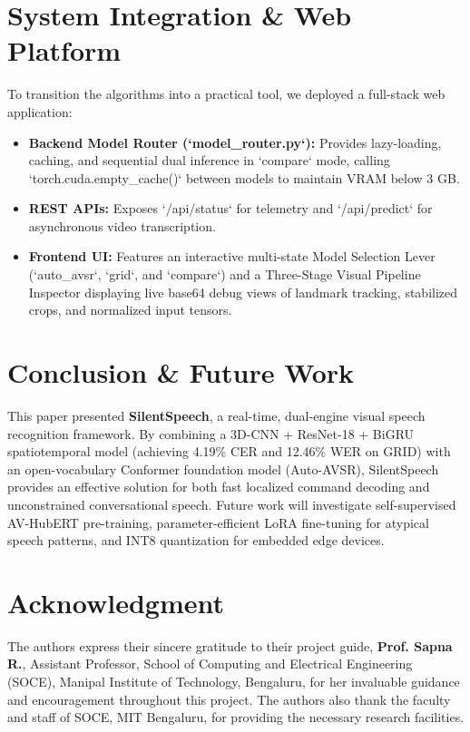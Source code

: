 \documentclass[conference,compsoc,10pt]{IEEEtran}
\begin{document}
\section{System Integration \& Web Platform}

To transition the algorithms into a practical tool, we deployed a full-stack web application:
\begin{itemize}
    \item \textbf{Backend Model Router (`model\_router.py`):} Provides lazy-loading, caching, and sequential dual inference in `compare` mode, calling `torch.cuda.empty_cache()` between models to maintain VRAM below 3 GB.
    \item \textbf{REST APIs:} Exposes `/api/status` for telemetry and `/api/predict` for asynchronous video transcription.
    \item \textbf{Frontend UI:} Features an interactive multi-state Model Selection Lever (`auto_avsr`, `grid`, and `compare`) and a Three-Stage Visual Pipeline Inspector displaying live base64 debug views of landmark tracking, stabilized crops, and normalized input tensors.
\end{itemize}

\section{Conclusion \& Future Work}
This paper presented \textbf{SilentSpeech}, a real-time, dual-engine visual speech recognition framework. By combining a 3D-CNN + ResNet-18 + BiGRU spatiotemporal model (achieving 4.19\% CER and 12.46\% WER on GRID) with an open-vocabulary Conformer foundation model (Auto-AVSR), SilentSpeech provides an effective solution for both fast localized command decoding and unconstrained conversational speech. Future work will investigate self-supervised AV-HubERT pre-training, parameter-efficient LoRA fine-tuning for atypical speech patterns, and INT8 quantization for embedded edge devices.

\section*{Acknowledgment}
The authors express their sincere gratitude to their project guide, \textbf{Prof. Sapna R.}, Assistant Professor, School of Computing and Electrical Engineering (SOCE), Manipal Institute of Technology, Bengaluru, for her invaluable guidance and encouragement throughout this project. The authors also thank the faculty and staff of SOCE, MIT Bengaluru, for providing the necessary research facilities.
\end{document}
